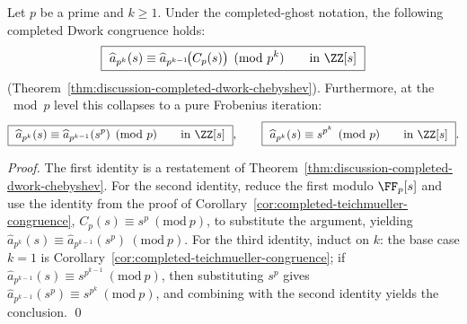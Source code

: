 \begin{corollary}\label{cor:completed-dwork-frobenius-tower}
Let \(p\) be a prime and \(k\ge 1\). Under the completed-ghost notation, the following completed Dwork congruence holds:
\[
\boxed{\ \widehat a_{p^k}(s)\equiv \widehat a_{p^{k-1}}\!\bigl(C_p(s)\bigr)\pmod{p^k}\qquad\text{in }\ZZ[s]\ }
\]
(Theorem~\ref{thm:discussion-completed-dwork-chebyshev}).
Furthermore, at the \(\bmod p\) level this collapses to a pure Frobenius iteration:
\[
\boxed{\ \widehat a_{p^k}(s)\equiv \widehat a_{p^{k-1}}(s^p)\pmod p\qquad\text{in }\ZZ[s]\ },
\qquad
\boxed{\ \widehat a_{p^k}(s)\equiv s^{p^k}\pmod p\qquad\text{in }\ZZ[s]\ }.
\]
\end{corollary}
\begin{proof}
The first identity is a restatement of Theorem~\ref{thm:discussion-completed-dwork-chebyshev}.
For the second identity, reduce the first modulo \(\FF_p[s]\) and use the identity from the proof of Corollary~\ref{cor:completed-teichmueller-congruence},
\(
C_p(s)\equiv s^p\ (\mathrm{mod}\ p)
\),
to substitute the argument, yielding
\(
\widehat a_{p^k}(s)\equiv \widehat a_{p^{k-1}}(s^p)\ (\mathrm{mod}\ p)
\).
For the third identity, induct on \(k\): the base case \(k=1\) is Corollary~\ref{cor:completed-teichmueller-congruence};
if \(\widehat a_{p^{k-1}}(s)\equiv s^{p^{k-1}}\ (\mathrm{mod}\ p)\), then substituting \(s^p\) gives
\(
\widehat a_{p^{k-1}}(s^p)\equiv s^{p^k}\ (\mathrm{mod}\ p)
\), and combining with the second identity yields the conclusion. \qed
\end{proof}


